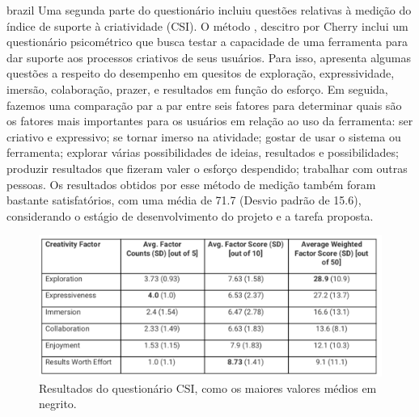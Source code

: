 \begin{otherlanguage*}{brazil}
Uma segunda parte do questionário incluiu questões relativas à medição do índice de suporte à criatividade (CSI). O método \cite{Cherry2014}, descitro por Cherry inclui um questionário psicométrico que busca testar a capacidade de uma ferramenta para dar suporte aos processos criativos de seus usuários. Para isso, apresenta algumas questões a respeito do desempenho em quesitos de exploração, expressividade, imersão, colaboração, prazer, e resultados em função do esforço. Em seguida, fazemos uma comparação par a par entre seis fatores para determinar quais são os fatores mais importantes para os usuários em relação ao uso da ferramenta: ser criativo e expressivo; se tornar imerso na atividade; gostar de usar o sistema ou ferramenta; explorar várias possibilidades de ideias, resultados e possibilidades; produzir resultados que fizeram valer o esforço despendido; trabalhar com outras pessoas. Os resultados obtidos por esse método de medição também foram bastante satisfatórios, com uma média de 71.7 (Desvio padrão de 15.6), considerando o estágio de desenvolvimento do projeto e a tarefa proposta.


\begin{figure}
\centering
\includegraphics[width=1\textwidth]{pictures/cap4/CSI}
\caption{\label{amas}Resultados do questionário CSI, como os maiores valores médios em negrito.}
\label{fig:questionnaire}
\end{figure}


 


\end{otherlanguage*}
